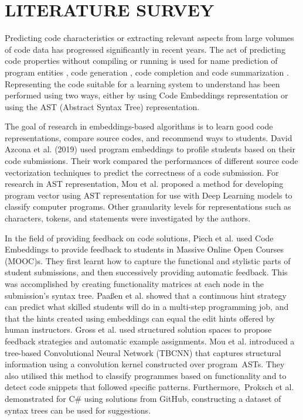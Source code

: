 
\chapter{LITERATURE SURVEY} %


Predicting code characteristics or extracting relevant aspects from large volumes of code data has progressed significantly in recent years. The act of predicting code properties without compiling or running is used for name prediction of program entities \cite{I}, code generation \cite{J}, code completion \cite{K} and code summarization \cite{L}. Representing the code suitable for a learning system to understand has been performed using two ways, either by using Code Embeddings representation or using the AST (Abstract Syntax Tree) representation. 

The goal of research in embeddings-based algorithms is to learn good code representations, compare source codes, and recommend ways to students. David Azcona et al. (2019) \cite{A} used program embeddings to profile students based on their code submissions. Their work compared the performances of different source code vectorization techniques to predict the correctness of a code submission. For research in AST representation, Mou et al. \cite{M} proposed a method for developing program vector using AST representation for use with Deep Learning models to classify computer programs. Other granularity levels for representations such as characters, tokens, and statements were investigated by the authors. 

In the field of providing feedback on code solutions, Piech et al. \cite{N} used Code Embeddings to provide feedback to students in Massive Online Open Courses (MOOC)s. They first learnt how to capture the functional and stylistic parts of student submissions, and then successively providing automatic feedback. This was accomplished by creating functionality matrices at each node in the submission's syntax tree. Paaßen et al. \cite{O} showed that a continuous hint strategy can predict what skilled students will do in a multi-step programming job, and that the hints created using embeddings can equal the edit hints offered by human instructors. Gross et al. \cite{P} used structured solution spaces to propose feedback strategies and automatic example assignments. Mou et al. \cite{Q} introduced a tree-based Convolutional Neural Network (TBCNN) that captures structural information using a convolution kernel constructed over program ASTs. They also utilised this method to classify programmes based on functionality and to detect code snippets that followed specific patterns. Furthermore, Proksch et al. \cite{R} demonstrated for C\# using solutions from GitHub, constructing a dataset of syntax trees can be used for suggestions.


